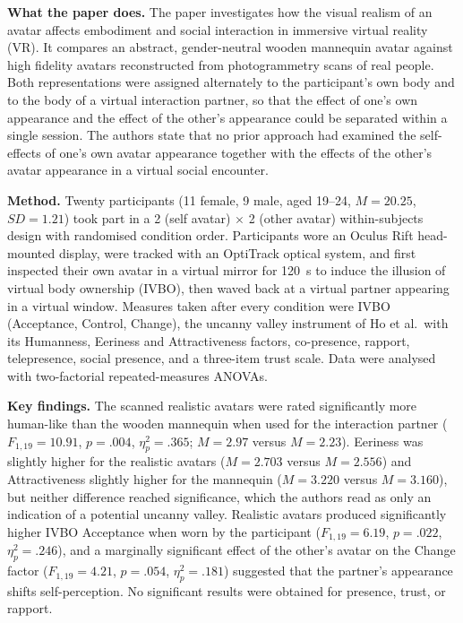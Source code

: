\documentclass[11pt, a4paper]{article}
\begin{document}
\textbf{What the paper does.} The paper investigates how the visual realism of an avatar affects embodiment and social interaction in immersive virtual reality (VR). It compares an abstract, gender-neutral wooden mannequin avatar against high fidelity avatars reconstructed from photogrammetry scans of real people. Both representations were assigned alternately to the participant's own body and to the body of a virtual interaction partner, so that the effect of one's own appearance and the effect of the other's appearance could be separated within a single session. The authors state that no prior approach had examined the self-effects of one's own avatar appearance together with the effects of the other's avatar appearance in a virtual social encounter.

\textbf{Method.} Twenty participants (11 female, 9 male, aged 19--24, $M = 20.25$, $SD = 1.21$) took part in a 2 (self avatar) $\times$ 2 (other avatar) within-subjects design with randomised condition order. Participants wore an Oculus Rift head-mounted display, were tracked with an OptiTrack optical system, and first inspected their own avatar in a virtual mirror for 120~s to induce the illusion of virtual body ownership (IVBO), then waved back at a virtual partner appearing in a virtual window. Measures taken after every condition were IVBO (Acceptance, Control, Change), the uncanny valley instrument of Ho et al.\ with its Humanness, Eeriness and Attractiveness factors, co-presence, rapport, telepresence, social presence, and a three-item trust scale. Data were analysed with two-factorial repeated-measures ANOVAs.

\textbf{Key findings.} The scanned realistic avatars were rated significantly more human-like than the wooden mannequin when used for the interaction partner ($F_{1,19} = 10.91$, $p = .004$, $\eta_p^2 = .365$; $M = 2.97$ versus $M = 2.23$). Eeriness was slightly higher for the realistic avatars ($M = 2.703$ versus $M = 2.556$) and Attractiveness slightly higher for the mannequin ($M = 3.220$ versus $M = 3.160$), but neither difference reached significance, which the authors read as only an indication of a potential uncanny valley. Realistic avatars produced significantly higher IVBO Acceptance when worn by the participant ($F_{1,19} = 6.19$, $p = .022$, $\eta_p^2 = .246$), and a marginally significant effect of the other's avatar on the Change factor ($F_{1,19} = 4.21$, $p = .054$, $\eta_p^2 = .181$) suggested that the partner's appearance shifts self-perception. No significant results were obtained for presence, trust, or rapport.
\end{document}
